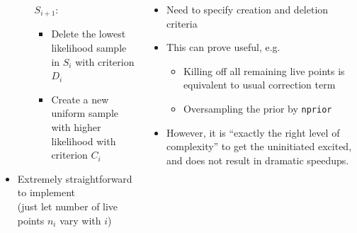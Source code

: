 \documentclass[aspectratio=169,handout]{beamer}
\begin{document}
\begin{frame}
\begin{columns}
\begin{itemize}
\begin{itemize}
                    \item[$S_{i+1}$:] 
                        \begin{itemize}
                            \item Delete the lowest likelihood sample in $S_{i}$ with criterion $D_i$
                            \item Create  a new uniform sample with higher likelihood with criterion $C_i$
                        \end{itemize}
                \end{itemize}
            \item Extremely straightforward to implement \\ (just let number of live points $n_i$ vary with $i$)
        \end{itemize}
        \begin{itemize}
            \item Need to specify creation and deletion criteria
            \item This can prove useful, e.g.
                \begin{itemize}
                    \item Killing off all remaining live points is equivalent to usual correction term
                    \item Oversampling the prior by \texttt{nprior}
                \end{itemize}
            \item However, it is ``exactly the right level of complexity'' to get the uninitiated excited, and does not result in dramatic speedups.
        \end{itemize}
    \end{columns}
\end{frame}
\end{document}
